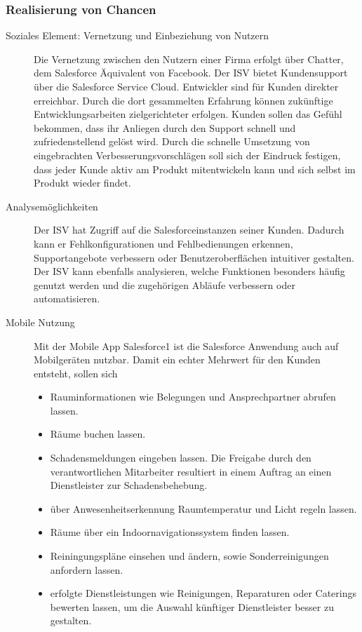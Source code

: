 \subsubsection{Realisierung von Chancen}
\begin{description}
	\item[Soziales Element: Vernetzung und Einbeziehung von Nutzern] Die 
Vernetzung zwischen den Nutzern einer Firma erfolgt über Chatter, dem 
Salesforce Äquivalent von Facebook. Der ISV bietet Kundensupport über die 
Salesforce Service Cloud. Entwickler sind für Kunden direkter erreichbar. Durch 
die dort gesammelten Erfahrung können zukünftige Entwicklungsarbeiten 
zielgerichteter erfolgen. Kunden sollen das Gefühl bekommen, 
dass ihr Anliegen durch den Support schnell und zufriedenstellend gelöst 
wird. Durch die schnelle Umsetzung von eingebrachten 
Verbesserungsvorschlägen soll sich der Eindruck festigen, dass jeder 
Kunde aktiv am Produkt mitentwickeln kann und sich selbst im Produkt wieder 
findet.
	\item[Analysemöglichkeiten] Der ISV hat Zugriff auf die 
Salesforceinstanzen seiner Kunden. Dadurch kann er Fehlkonfigurationen 
und Fehlbedienungen erkennen, Supportangebote verbessern oder 
Benutzeroberflächen intuitiver gestalten. Der ISV kann ebenfalls analysieren, 
welche Funktionen besonders häufig genutzt werden und die zugehörigen Abläufe 
verbessern oder automatisieren.
	\item[Mobile Nutzung] Mit der Mobile App Salesforce1 ist die Salesforce 
Anwendung auch auf Mobilgeräten nutzbar. Damit ein echter Mehrwert für 
den Kunden entsteht, sollen sich
\begin{itemize}
	\item Rauminformationen wie Belegungen und Ansprechpartner abrufen 
lassen.
	\item Räume buchen lassen.
	\item Schadensmeldungen eingeben lassen. Die Freigabe durch den 
verantwortlichen Mitarbeiter resultiert in einem Auftrag an einen Dienstleister 
zur Schadensbehebung.
	\item über Anwesenheitserkennung Raumtemperatur und Licht regeln lassen.
	\item Räume über ein Indoornavigationssystem finden lassen.
	\item Reiningungspläne einsehen und ändern, sowie Sonderreinigungen 
anfordern lassen.
	\item erfolgte Dienstleistungen wie Reinigungen, Reparaturen oder 
Caterings bewerten lassen, um die Auswahl künftiger Dienstleister besser zu 
gestalten.
\end{itemize}


\end{description}
